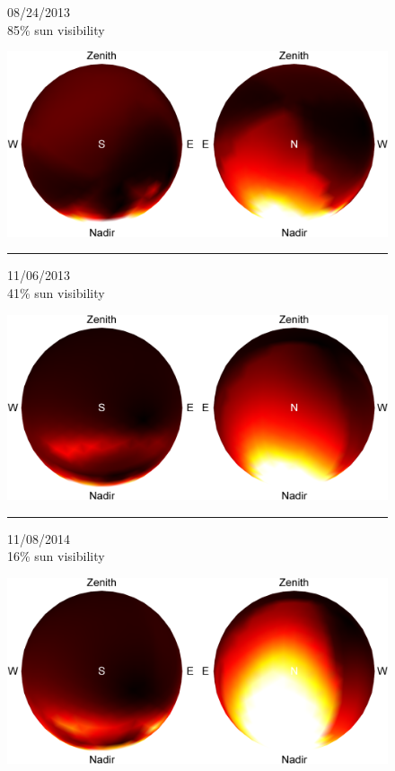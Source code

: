 \begin{figure}[t]
    \centering
    \begin{sideways}\begin{minipage}{.25\linewidth}\centering \scriptsize 08/24/2013 \\ 85\% sun visibility \vspace{5pt} \end{minipage}\end{sideways}
    \includegraphics[width=.5\linewidth]{./figures/confidenceIntervals/20130824_10pm.png} \\
    \vspace{-.8em} \noindent\rule{\linewidth}{0.1pt}
    \begin{sideways}\begin{minipage}{.25\linewidth}\centering \scriptsize 11/06/2013 \\ 41\% sun visibility \vspace{5pt} \end{minipage}\end{sideways}
    \includegraphics[width=.5\linewidth]{./figures/confidenceIntervals/20131106_10pm.png} \\
    \vspace{-.8em} \noindent\rule{\linewidth}{0.1pt}
    \begin{sideways}\begin{minipage}{.25\linewidth}\centering \scriptsize 11/08/2014 \\ 16\% sun visibility \vspace{5pt} \end{minipage}\end{sideways}
    \includegraphics[width=.5\linewidth]{./figures/confidenceIntervals/20141108_10pm.png} \\

\end{figure}

